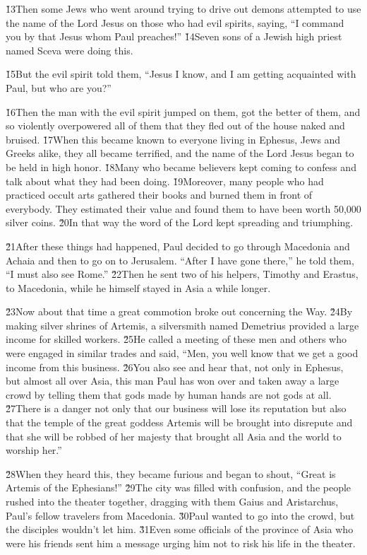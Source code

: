 \v{13}Then some Jews who went around trying to drive out demons attempted to use the name of the Lord Jesus on those who had evil spirits, saying, ``I command you by that Jesus whom Paul preaches!'' \v{14}Seven sons of a Jewish high priest named Sceva were doing this.

\v{15}But the evil spirit told them, ``Jesus I know, and I am getting acquainted with Paul, but who are you?''

\v{16}Then the man with the evil spirit jumped on them, got the better of them, and so violently overpowered all of them that they fled out of the house naked and bruised. \v{17}When this became known to everyone living in Ephesus, Jews and Greeks alike, they all became terrified, and the name of the Lord Jesus began to be held in high honor. \v{18}Many who became believers kept coming to confess and talk about what they had been doing. \v{19}Moreover, many people who had practiced occult arts gathered their books and burned them in front of everybody. They estimated their value and found them to have been worth 50,000 silver coins. \v{20}In that way the word of the Lord kept spreading and triumphing.

\v{21}After these things had happened, Paul decided to go through Macedonia and Achaia and then to go on to Jerusalem. ``After I have gone there,'' he told them, ``I must also see Rome.'' \v{22}Then he sent two of his helpers, Timothy and Erastus, to Macedonia, while he himself stayed in Asia a while longer.

\v{23}Now about that time a great commotion broke out concerning the Way. \v{24}By making silver shrines of Artemis, a silversmith named Demetrius provided a large income for skilled workers. \v{25}He called a meeting of these men and others who were engaged in similar trades and said, ``Men, you well know that we get a good income from this business. \v{26}You also see and hear that, not only in Ephesus, but almost all over Asia, this man Paul has won over and taken away a large crowd by telling them that gods made by human hands are not gods at all. \v{27}There is a danger not only that our business will lose its reputation but also that the temple of the great goddess Artemis will be brought into disrepute and that she will be robbed of her majesty that brought all Asia and the world to worship her.''

\v{28}When they heard this, they became furious and began to shout, ``Great is Artemis of the Ephesians!'' \v{29}The city was filled with confusion, and the people rushed into the theater together, dragging with them Gaius and Aristarchus, Paul's fellow travelers from Macedonia. \v{30}Paul wanted to go into the crowd, but the disciples wouldn't let him. \v{31}Even some officials of the province of Asia who were his friends sent him a message urging him not to risk his life in the theater.

